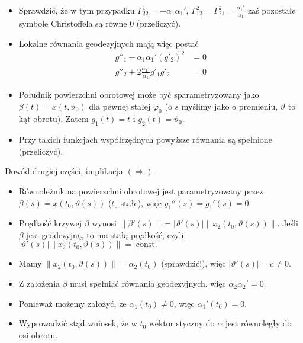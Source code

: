 \begin{frame}
\begin{itemize}
\item Sprawdzić, że w tym przypadku $\Gamma_{22}^1=-\alpha_1\alpha_1'$, $\Gamma_{12}^2=\Gamma_{21}^2=\frac{\alpha_1'}{\alpha_1}$ zaś pozostałe symbole Christoffela są równe $0$ (przeliczyć).
\pause \item Lokalne równania geodezyjnych mają więc postać
\begin{align*}
g''_1-\alpha_1\alpha_1'(g'_2)^2&=0\\
g''_2+2\frac{\alpha_1'}{\alpha_1}g'_1g'_2&=0
\end{align*}\vspace*{-0.2in}
\pause \item Południk powierzchni obrotowej może być sparametryzowany jako $\beta(t)=x(t,\vartheta_0)$ dla pewnej stałej $\varphi_0$ (o $s$ myślimy jako o promieniu, $\vartheta$ to kąt obrotu). Zatem $g_1(t)=t$ i $g_2(t)=\vartheta_0$.
\pause \item Przy takich funkcjach współrzędnych powyższe równania są spełnione (przeliczyć).
\end{itemize}
\bigskip
\end{frame}
\begin{frame}
Dowód drugiej części, implikacja $(\Rightarrow)$.
\begin{itemize}[<+->]
\item Równoleżnik na powierzchni obrotowej jest parametryzowany przez $\beta(s)=x(t_0,\vartheta(s))$ ($t_0$ stałe), więc $g_1''(s)=g_1'(s)=0$.
\item Prędkość krzywej $\beta$ wynosi $\|\beta'(s)\|=|\vartheta'(s)|\|x_2(t_0,\vartheta(s))\|$. Jeśli $\beta$ jest geodezyjną, to ma stałą prędkość, czyli $|\vartheta'(s)|\|x_2(t_0,\vartheta(s))\|=\operatorname{const.}$
\item Mamy $\|x_2(t_0,\vartheta(s))\|=\alpha_2(t_0)$ (sprawdzić!), więc $|\vartheta'(s)|=c\neq 0$.
\item Z założenia $\beta$ musi spełniać równania geodezyjnych, więc $\alpha_2\alpha_2'=0$. 
\item Ponieważ możemy założyć, że $\alpha_1(t_0)\neq 0$, więc $\alpha_1'(t_0)=0$.
\item Wyprowadzić stąd wniosek, że w $t_0$ wektor styczny do $\alpha$ jest równoległy do osi obrotu.
\end{itemize}
\end{frame}
\bigskip
